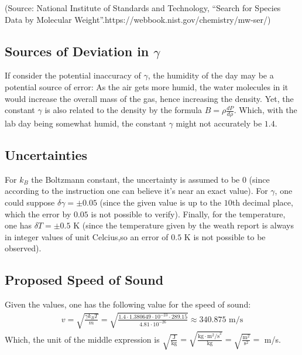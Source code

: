 \documentclass{article}
\begin{document}
(Source: National Institute of Standards and Technology, ``Search for Species Data by Molecular Weight''.https://webbook.nist.gov/chemistry/mw-ser/)

\hfil

\subsection{Sources of Deviation in $\gamma$}
If consider the potential inaccuracy of $\gamma$, the humidity of the day may be a potential source of error: As the air gets more humid, the water molecules in it would increase the overall mass of the gas, hence increasing the density. Yet, the constant $\gamma$ is also related to the density by the formula $B = \rho\frac{dP}{d\rho}$. Which, with the lab day being somewhat humid, the constant $\gamma$ might not accurately be $1.4$.

\hfil

\subsection{Uncertainties}
For $k_B$ the Boltzmann constant, the uncertainty is assumed to be $0$ (since according to the instruction one can believe it's near an exact value). For $\gamma$, one could suppose $\delta \gamma=\pm 0.05$ (since the given value is up to the $10$th decimal place, which the error by $0.05$ is not possible to verify). Finally, for the temperature, one has $\delta T = \pm 0.5$ K (since the temperature given by the weath report is always in integer values of unit Celcius,so an error of $0.5$ K is not possible to be observed).

\hfil

\subsection{Proposed Speed of Sound}
Given the values, one has the following value for the speed of sound:
\begin{align}
    v=\sqrt{\frac{\gamma k_B T}{m}} = \sqrt{\frac{1.4\cdot 1.380649\cdot 10^{-23}\cdot 289.15}{4.81\cdot 10^{-26}}} \approx 340.875 \text{ m/s}
\end{align}
Which, the unit of the middle expression is $\sqrt{\frac{\text{J}}{\text{kg}}}=\sqrt{\frac{\text{kg}\cdot\text{m}^2\text{/s}^2}{\text{kg}}} = \sqrt{\frac{\text{m}^2}{\text{s}^2}} =$ m/s.

\hfil

\hfil
\end{document}
